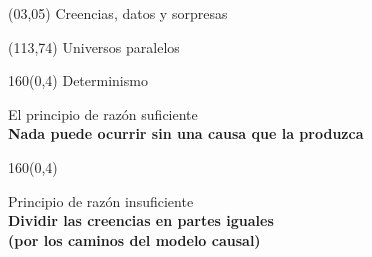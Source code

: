 \documentclass[shownotes,aspectratio=169]{beamer}
\newif\ifes
\newcommand{\es}[1]{\ifes#1\fi}
\begin{document}
\color{black!85}
\large

 

\begin{frame}
 
 \begin{textblock}{90}(03,05)
 \centering \huge  \textcolor{black!40}{Creencias, datos y sorpresas}
\end{textblock}

 \begin{textblock}{47}(113,74)
\centering \Large  \textcolor{white!55}{Universos paralelos}
\end{textblock}

{}
\end{frame}

\begin{frame}[plain]
 \begin{textblock}{160}(0,4)
 \centering \LARGE
Determinismo
\end{textblock}
\vspace{0.75cm}

\begin{center} 
El principio de razón suficiente \\

\Large
\textbf{Nada puede ocurrir sin una causa que la produzca}
\end{center} 
 
\end{frame}


\begin{frame}[plain]
\begin{textblock}{160}(0,4)
 \centering \LARGE 
 \es{Incertidumbre \textbf{honesta}}
 \end{textblock}
\vspace{1cm}

 \begin{center}
 Principio de razón insuficiente \\
   \Large
\textbf{Dividir las creencias en partes iguales \\ (por los caminos del modelo causal)}
 \end{center}
\end{frame}
\end{document}
